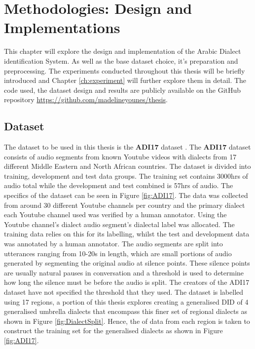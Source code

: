 \chapter{Methodologies: Design and Implementations}\label{ch:methodologies}
This chapter will explore the design and implementation of the Arabic Dialect identification System. 
As well as the base dataset choice, it's preparation and preprocessing. The experiments conducted throughout 
this thesis will be briefly introduced and Chapter \ref{ch:experiment} will further explore them in detail. 
The code used, the dataset design and results are publicly available on the GitHub repository 
\url{https://github.com/madelineyounes/thesis}. 


\section{Dataset}\label{sect:dataset}
The dataset to be used in this thesis is the \textbf{ADI17} dataset \cite{shon_adi17_2020}. The \textbf{ADI17} dataset consists of audio segments from known Youtube videos with dialects from 17 different Middle Eastern and North
African countries. The dataset is divided into training, development and test data groups. The training set contains 
3000hrs of audio total while the development and test combined is 57hrs of audio. The specifics of the dataset can be seen in Figure \ref{fig:ADI17}.
The data was collected from around 30 different Youtube channels per country and the primary dialect each Youtube channel used was verified by a human annotator. Using the Youtube channel's 
dialect audio segment's dialectal label was allocated. The training data relies on this for its labelling, whilst 
the test and development data was annotated by a human annotator. The audio segments are split into utterances ranging from 10-20s in length, which are small portions  
of audio generated by segmenting the original audio at silence points. These silence points are usually natural pauses in conversation and a threshold 
is used to determine how long the silence must be before the audio is split. The creators of the ADI17 dataset have not specified the threshold that they used. 
The dataset is labelled using 17 regions, a portion of this thesis explores creating a generalised DID of 4 generalised umbrella dialects that encompass this finer set of regional dialects as shown in Figure \ref{fig:DialectSplit}. 
Hence, the of data from each region is taken to construct the training set for the generalised dialects as shown in Figure \ref{fig:ADI17}. 
